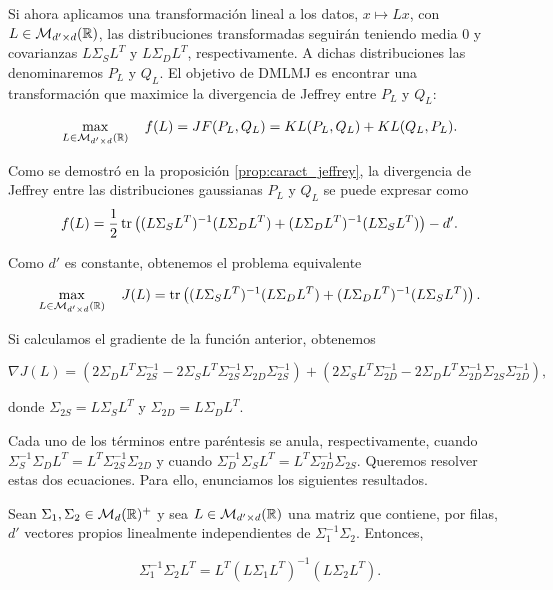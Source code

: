 \documentclass{book}
\begin{document}
Si ahora aplicamos una transformación lineal a los datos, $x \mapsto Lx$, con $L \in \mathcal{M}_{d'\times d}(\mathbb{R})$, las distribuciones transformadas seguirán teniendo media 0 y covarianzas $L\Sigma_S L^T$ y $L\Sigma_D L^T$, respectivamente. A dichas distribuciones las denominaremos $P_L$ y $Q_L$. El objetivo de DMLMJ es encontrar una transformación que maximice la divergencia de Jeffrey entre $P_L$ y $Q_L$:

\[ \max_{L \in \mathcal{M}_{d'\times d}(\mathbb{R})} \quad f(L) =  JF(P_L,Q_L) = KL(P_L,Q_L) + KL(Q_L,P_L).\]

Como se demostró en la proposición \ref{prop:caract_jeffrey}, la divergencia de Jeffrey entre las distribuciones gaussianas $P_L$ y $Q_L$ se puede expresar como 
\[ f(L) = \frac{1}{2} \operatorname{tr}\left( (L\Sigma_S L^T)^{-1} (L\Sigma_D L^T) + (L \Sigma_D L^T)^{-1} (L \Sigma_S L^T) \right) - d'. \]

Como $d'$ es constante, obtenemos el problema equivalente

\[ \max_{L \in \mathcal{M}_{d'\times d}(\mathbb{R})} \quad J(L) =  \operatorname{tr}\left( (L\Sigma_S L^T)^{-1} (L\Sigma_D L^T) + (L \Sigma_D L^T)^{-1} (L \Sigma_S L^T) \right).\]

Si calculamos el gradiente de la función anterior, obtenemos

\[ \nabla J(L) = \left( 2 \Sigma_D L^T\Sigma_{2S}^{-1} - 2\Sigma_S L^T \Sigma_{2S}^{-1}\Sigma_{2D}\Sigma_{2S}^{-1} \right) + \left( 2\Sigma_S L^T \Sigma_{2D}^{-1} - 2 \Sigma_D L^T \Sigma_{2D}^{-1}\Sigma_{2S} \Sigma_{2D}^{-1} \right),\]

donde $\Sigma_{2S} = L \Sigma_S L^T$ y $\Sigma_{2D} = L\Sigma_D L^T$.

Cada uno de los términos entre paréntesis se anula, respectivamente, cuando $\Sigma_S^{-1} \Sigma_D L^T = L^T \Sigma_{2S}^{-1} \Sigma_{2D}$ y cuando $\Sigma_{D}^{-1}\Sigma_S L^T = L^T \Sigma_{2D}^{-1} \Sigma_{2S}$. Queremos resolver estas dos ecuaciones. Para ello, enunciamos los siguientes resultados.

\begin{thm}

	Sean $\Sigma_1, \Sigma_2 \in \mathcal{M}_d(\mathbb{R})^+$ y sea $L \in \mathcal{M}_{d'\times d}(\mathbb{R})$ una matriz que contiene, por filas, $d'$ vectores propios linealmente independientes de $\Sigma_1^{-1}\Sigma_2$. Entonces,

	\begin{equation} \label{eq:jef:thm1}
		\Sigma_1^{-1}\Sigma_2L^T = L^T(L\Sigma_1L^T)^{-1}(L\Sigma_2L^T).
	\end{equation}
\end{thm}
\end{document}
